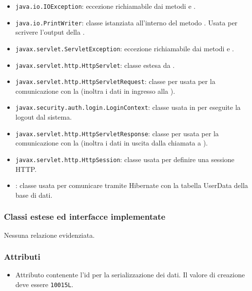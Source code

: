\begin{itemize}
	\item \texttt{java.io.IOException}: eccezione richiamabile dai metodi  e .
	\item \texttt{java.io.PrintWriter}: classe istanziata all'interno del metodo . Usata per scrivere l'output della .
	\item \texttt{javax.servlet.ServletException}: eccezione richiamabile dai metodi  e .
	\item \texttt{javax.servlet.http.HttpServlet}: classe estesa da .
	\item \texttt{javax.servlet.http.HttpServletRequest}:  classe per usata per la comunicazione con la  (inoltra i dati in ingresso alla ).
	\item \texttt{javax.security.auth.login.LoginContext}: classe usata in  per eseguite la logout dal sistema.
	\item \texttt{javax.servlet.http.HttpServletResponse}: classe per usata per la comunicazione con la  (inoltra i dati in uscita dalla chiamata a ).
	\item \texttt{javax.servlet.http.HttpSession}: classe usata per definire una sessione HTTP.
	\item {}: classe usata per comunicare tramite Hibernate con la tabella UserData della base di dati.
\end{itemize}

\subsubsection*{Classi estese ed interfacce implementate}

Nessuna relazione evidenziata.

\subsubsection*{Attributi}

\begin{itemize}
	\item{}
	Attributo contenente l'id per la serializzazione dei dati. Il valore di creazione deve essere \texttt{10015L}.
\end{itemize}

